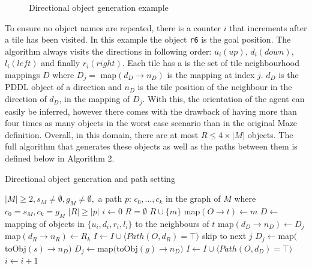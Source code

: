 \begin{figure}[h!]
    \caption{Directional object generation example}
\end{figure}

\noindent To ensure no object names are repeated, there is a counter $i$ that increments after a tile has been visited. In this example the object \texttt{r6} is the goal position. The algorithm always visits the directions in following order: $u_i (up)$, $d_i (down)$, $l_i (left)$ and finally $r_i (right)$. Each tile has a is the set of tile neighbourhood mappings $D$ where $D_j =$ map$(d_D \rightarrow n_D)$ is the mapping at index $j$. $d_D$ is the PDDL object of a direction and $n_D$ is the tile position of the neighbour in the direction of $d_D$, in the mapping of $D_j$. With this, the orientation of the agent can easily be inferred, however there comes with the drawback of having more than four times as many objects in the worst case scenario than in the original Maze definition. Overall, in this domain, there are at most $R \leq 4 \times |M|$ objects. The full algorithm that generates these objects as well as the paths between them is defined below in Algorithm 2.

\newpage
\begin{algorithm}[h!]
    \caption{Directional object generation and path setting}\label{alg:cap}
    \begin{algorithmic}
        \Require $|M| \geq 2, s_M \neq \emptyset, g_M \neq \emptyset,$ a path $p$: $c_0, ..., c_k$ 
        in the graph of $M$ where $c_0 = s_M, c_k = g_M$
        \Ensure $|R| \geq |p|$
        \State $i \gets 0$
        \State $R = \emptyset$
            \State $R \cup \{m\}$
            \State map$(O \rightarrow t) \gets m$
            \State $D \gets$ mapping of objects in $\{u_i, d_i, r_i, l_i\}$ to the neighbours of $t$
                \State map$(d_D \rightarrow n_D) \gets D_j$
                    \State map$(d_R \rightarrow n_R) \gets R_k$
                        \State $I \gets I \cup \langle Path(O, d_R) = \top \rangle$ 
                        \State skip to next $j$
                    \EndIf
                    \EndFor
                \EndIf
                    \State $D_j \gets $map$($toObj$(s) \rightarrow n_D)$
                \EndIf
                    \State $D_j \gets $map$($toObj$(g) \rightarrow n_D)$
                \EndIf
                \State $I \gets I \cup \langle Path(O, d_D) = \top \rangle$
                \State $i \gets i + 1$
                \State {}
            \EndFor
        \EndProcedure
        \State {}
    \end{algorithmic}
\end{algorithm}

